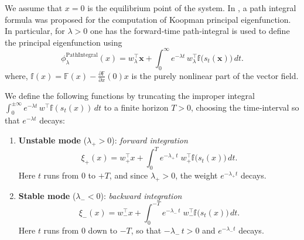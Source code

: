 \documentclass[11pt]{article}
\theoremstyle{plain}
\newcommand{\bs}{{\mathbf s}}
\newcommand{\bF}{{\mathbf F}}
\newcommand{\bw}{{\mathbf w}}
\newcommand{\bx}{{\mathbf x}}
\def\[{\begin{equation}}
\def\]{\end{equation}}
\begin{document}
We assume that $x=0$ is the equilibrium point of the system. In \cite{deka2023pathintegralformulacomputingkoopman}, a path integral formula was proposed for the computation of Koopman principal eigenfunction. In particular, for        
   \(\lambda>0\) one has the forward‐time path‐integral is used  to define the principal eigenfunction using
{ 
\[
\phi_\lambda^{\mathrm{Path Integral}}(x)= w_\lambda^\top\mathbf{x}
  + \int_0^\infty e^{-\lambda t}\,
    w_\lambda^\top {\mathbb f}\bigl(s_t(\mathbf{x})\bigr)\,dt.
\]
where, ${\mathbb f}(x)={\mathbb F}(x)-\frac{\partial {\mathbb F}}{\partial x}(0)x$ is the purely nonlinear part of the vector field. }


We define the following functions by truncating the improper integral
\(\displaystyle\int_0^{\pm\infty}e^{-\lambda t}\,w^\top {\mathbb f}(s_t(x))\,dt\) to a finite horizon \(T>0\), choosing the time‐interval so that \(e^{-\lambda t}\) decays:

\begin{enumerate}
  \item \textbf{Unstable mode} (\(\lambda_+>0\)): \emph{forward integration}
  \[
    \xi_+(x)
    = w_+^\top x
    + \int_{0}^{T}
        e^{-\lambda_+\,t}\;
        w_+^\top {\mathbb f}\bigl(s_t(x)\bigr)\,dt.
  \]
  Here \(t\) runs from \(0\) to \(+T\), and since \(\lambda_+>0\), the weight \(e^{-\lambda_+t}\) decays.

  \item \textbf{Stable mode} (\(\lambda_-<0\)): \emph{backward integration}
  \[
    \xi_-(x)
    = w_-^\top x
    + \int_{0}^{-T}
        e^{-\lambda_-\,t}\;
        w_-^\top {\mathbb f}\bigl(s_t(x)\bigr)\,dt.
  \]
  Here \(t\) runs from \(0\) down to \(-T\), so that \(-\lambda_-\,t>0\) and \(e^{-\lambda_-t}\) decays.
\end{enumerate}
\end{document}
